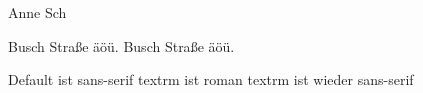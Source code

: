 \documentclass[12pt]{article}
\begin{document}
\obeylines


Anne Sch

Busch Straße äöü.
Busch Stra{\ss}e äöü.

Default ist sans-serif
\textrm{textrm ist roman}
\textsf{textrm ist wieder sans-serif}


  
\end{document}
